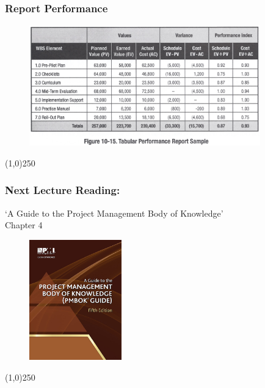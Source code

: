 \begin{frame}
\frametitle{Report Performance}
\begin{figure}
	\centering
		\includegraphics[width = 10cm]{images/Fig10-15.jpg}
	\label{fig:10-15}
\end{figure}
\end{frame}\begin{center}\line(1,0){250}\end{center}


\begin{frame}
\frametitle{Next Lecture \hfill\hfill Reading:}
`A Guide to the Project Management Body of Knowledge'\\ 
Chapter 4
\begin{figure}[h]
	\centering
		\includegraphics[width = 4cm]{images/book.jpg}
\end{figure}
\end{frame}\begin{center}\line(1,0){250}\end{center}





